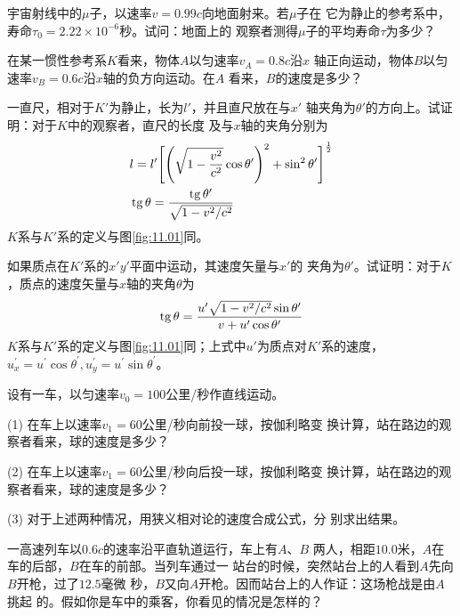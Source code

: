 \begin{exercises}

\exercise 宇宙射线中的$ \mu $子，以速率$  v = 0 . 9 9 c   $向地面射来。若$ \mu $子在
它为静止的参考系中，寿命$  \tau _ { 0 } = 2 . 2 2 \times 1 0 ^ { - 6 }   $秒。试问：地面上的
观察者测得$ \mu $子的平均寿命$ \tau $为多少？

\exercise 在某一惯性参考系$ K $看来，物体$ A $以匀速率$  v _ { A } = 0 . 8 c $沿$  x  $
轴正向运动，物体$ B $以匀速率$  v _ { B } = 0 . 6 c  $沿$ x $轴的负方向运动。在$ A $
看来，$ B $的速度是多少？

\exercise 一直尺，相对于$ K' $为静止，长为$ l' $，并且直尺放在与$ x' $
轴夹角为$ \theta ' $的方向上。试证明：对于$ K $中的观察者，直尺的长度
及与$ x $轴的夹角分别为
\begin{align*}
    &l=l^{\prime}\Bigg[\Bigg(\sqrt{1-\frac{v^{2}}{c^{2}}} \cos \theta^{\prime}\Bigg)^{2}+\sin ^{2} \theta^{\prime}\Bigg]^{\frac{1}{2}} \\
    &\operatorname{tg} \theta=\frac{\operatorname{tg} \theta^{\prime}}{\sqrt{1-v^{2} / c^{2}}}
\end{align*}
$ K $系与$ K' $系的定义与图\ref{fig:11.01}同。

\exercise 如果质点在$ K' $系的$ x'y' $平面中运动，其速度矢量与$ x' $的
夹角为$ \theta ' $。试证明：对于$ K $，质点的速度矢量与$ x $轴的夹角$ \theta $为
\begin{equation*}
    \operatorname{tg} \theta=\frac{u^{\prime} \sqrt{1-v^{2} / c^{2}} \sin \theta^{\prime}}{v+u^{\prime} \cos \theta^{\prime}}
\end{equation*}
$ K $系与$ K' $系的定义与图\ref{fig:11.01}同；上式中$ u' $为质点对$ K' $系的速度，
$ u _ x ^ { \prime } = u ^ { \prime } \cos \theta ^ { \prime } , u _ y ^ { \prime } = u ^ { \prime } \sin \theta ^ { \prime } $。

\exercise 设有一车，以匀速率$  v _ { 0 } = 1 0 0   $公里/秒作直线运动。

(1) 在车上以速率$  v _ { 1 } = 6 0   $公里/秒向前投一球，按伽利略变
换计算，站在路边的观察者看来，球的速度是多少？

(2) 在车上以速率$  v _ { 1 } = 6 0   $公里/秒向后投一球，按伽利略变
换计算，站在路边的观察者看来，球的速度是多少？

(3) 对于上述两种情况，用狭义相对论的速度合成公式，分
别求出结果。

\exercise 一高速列车以$ 0.6c $的速率沿平直轨道运行，车上有$ A $、$ B $
两人，相距$ 10.0 $米，$ A $在车的后部，$ B $在车的前部。当列车通过一
站台的时候，突然站台上的人看到$ A $先向$ B $开枪，过了$ 12.5 $毫微
秒，$ B $又向$ A $开枪。因而站台上的人作证：这场枪战是由$ A $挑起
的。假如你是车中的乘客，你看见的情况是怎样的？


\end{exercises}
